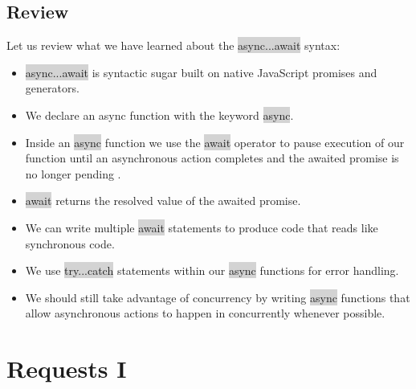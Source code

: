 \documentclass[11pt]{article}
\begin{document}
\subsection{Review}
Let us review what we have learned about the \colorbox{lightgray}{async...await} syntax:
\begin{itemize}[leftmargin = *]
\item \colorbox{lightgray}{async...await} is syntactic sugar built on native JavaScript promises and generators.
\item We declare an async function with the keyword \colorbox{lightgray}{async}.
\item Inside an \colorbox{lightgray}{async} function we use the \colorbox{lightgray}{await} operator to pause execution of our function until an asynchronous action completes and the awaited promise is no longer pending .
\item \colorbox{lightgray}{await} returns the resolved value of the awaited promise.
\item We can write multiple \colorbox{lightgray}{await} statements to produce code that reads like synchronous code.
\item We use \colorbox{lightgray}{try...catch} statements within our \colorbox{lightgray}{async} functions for error handling.
\item We should still take advantage of concurrency by writing \colorbox{lightgray}{async} functions that allow asynchronous actions to happen in concurrently whenever possible.
\end{itemize}

\newpage
\section{Requests I}
\end{document}
